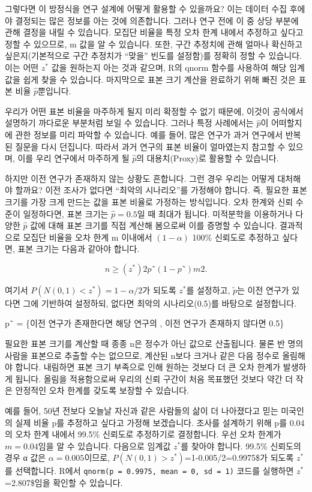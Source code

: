 \documentclass[
]{scrbook}
\begin{document}
그렇다면 이 방정식을 연구 설계에 어떻게 활용할 수 있을까요? 이는 데이터
수집 후에야 결정되는 많은 정보를 아는 것에 의존합니다. 그러나 연구 전에
이 중 상당 부분에 관해 결정을 내릴 수 있습니다. 모집단 비율을 특정 오차
한계 내에서 추정하고 싶다고 정할 수 있으므로, m 값을 알 수 있습니다.
또한, 구간 추정치에 관해 얼마나 확신하고 싶은지(기본적으로 구간 추정치가
``맞을'' 빈도를 설정함)를 정확히 정할 수 있습니다. 이는 어떤 \(z^*\)
값을 원하는지 아는 것과 같으며, R의 qnorm 함수를 사용하여 해당 임계값을
쉽게 찾을 수 있습니다. 마지막으로 표본 크기 계산을 완료하기 위해 빠진
것은 표본 비율 \(\hat{p}\)뿐입니다.

우리가 어떤 표본 비율을 마주하게 될지 미리 확정할 수 없기 때문에, 이것이
공식에서 설명하기 까다로운 부분처럼 보일 수 있습니다. 그러나 특정
사례에서는 \(\hat{p}\)이 어떠할지에 관한 정보를 미리 파악할 수 있습니다.
예를 들어, 많은 연구가 과거 연구에서 반복된 질문을 다시 던집니다. 따라서
과거 연구의 표본 비율이 얼마였는지 참고할 수 있으며, 이를 우리 연구에서
마주하게 될 \(\hat{p}\)의 대용치(Proxy)로 활용할 수 있습니다.

하지만 이전 연구가 존재하지 않는 상황도 흔합니다. 그런 경우 우리는
어떻게 대처해야 할까요? 이전 조사가 없다면 ``최악의 시나리오''를
가정해야 합니다. 즉, 필요한 표본 크기를 가장 크게 만드는 값을 표본
비율로 가정하는 방식입니다. 오차 한계와 신뢰 수준이 일정하다면, 표본
크기는 \(\hat{p}=0.5\)일 때 최대가 됩니다. 미적분학을 이용하거나 다양한
\(\hat{p}\) 값에 대해 표본 크기를 직접 계산해 봄으로써 이를 증명할 수
있습니다. 결과적으로 모집단 비율을 오차 한계 m 이내에서 \((1-\alpha)\)
100\% 신뢰도로 추정하고 싶다면, 표본 크기는 다음과 같아야 합니다.

\[
n\ge (z^*)2p˜(1-p˜)m2.
\]

여기서 \(P(N(0,1)<z^*) = 1-\alpha/2\)가 되도록 \(z^*\)를 설정하고,
\(\tilde{p}\)는 이전 연구가 있다면 그에 기반하여 설정하되, 없다면 최악의
시나리오(0.5)를 바탕으로 설정합니다.

p˜ = \{이전 연구가 존재한다면 해당 연구의 , 이전 연구가 존재하지
않다면 0.5\}

필요한 표본 크기를 계산할 때 종종 n은 정수가 아닌 값으로 산출됩니다.
물론 반 명의 사람을 표본으로 추출할 수는 없으므로, 계산된 n보다 크거나
같은 다음 정수로 올림해야 합니다. 내림하면 표본 크기 부족으로 인해
원하는 것보다 더 큰 오차 한계가 발생하게 됩니다. 올림을 적용함으로써
우리의 신뢰 구간이 처음 목표했던 것보다 약간 더 작은 안정적인 오차
한계를 갖도록 보장할 수 있습니다.

예를 들어, 50년 전보다 오늘날 자신과 같은 사람들의 삶이 더 나아졌다고
믿는 미국인의 실제 비율 p를 추정하고 싶다고 가정해 보겠습니다. 조사를
설계하기 위해 p를 0.04의 오차 한계 내에서 99.5\% 신뢰도로 추정하기로
결정합니다. 우선 오차 한계가 \(m=0.04\)임을 알 수 있습니다. 다음으로
임계값 \(z^*\)를 찾아야 합니다. 99.5\% 신뢰도의 경우 α 값은
\(\alpha=0.005\)이므로, \(P(N(0,1)>z^*)\)=1-0.005/2=0.9975\$가 되도록
\(z^*\)를 선택합니다. R에서
\texttt{qnorm(p\ =\ 0.9975,\ mean\ =\ 0,\ sd\ =\ 1)} 코드를 실행하면
\(z^*\)=2.807\$임을 확인할 수 있습니다.
\end{document}
